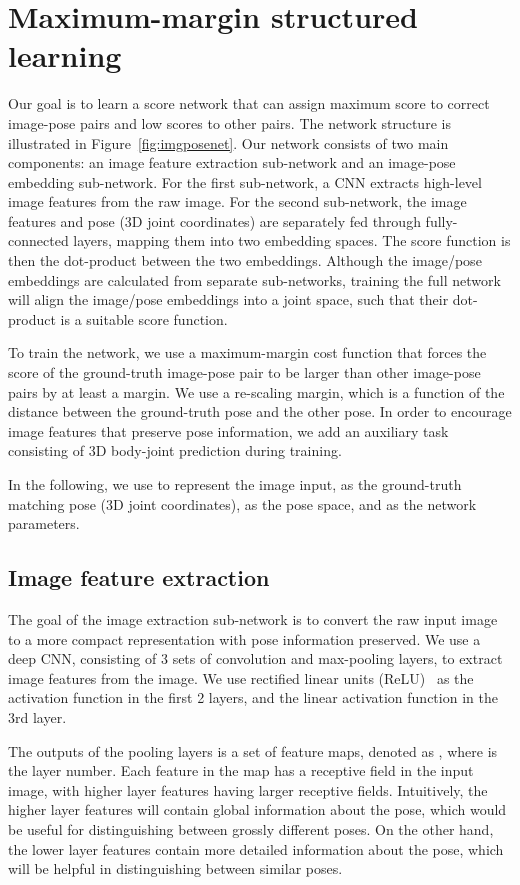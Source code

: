 \documentclass[10pt,twocolumn,letterpaper]{article}
\begin{document}
 \section{Maximum-margin structured learning}
\label{sec:structnet}
Our goal is to learn a score network that can assign maximum score to  correct image-pose pairs and low scores to other pairs.
The network structure is illustrated in Figure~\ref{fig:imgposenet}.
Our network consists of two main components: an image feature extraction sub-network and an image-pose embedding sub-network.
For the first sub-network, a CNN extracts high-level image features from the raw image.
For the second sub-network, 
the image features and pose (3D joint coordinates) are separately fed through fully-connected layers, mapping them into two embedding spaces. The score function is then the dot-product between the two embeddings.
Although the image/pose embeddings are calculated from separate sub-networks, training the full network will align the image/pose embeddings into a joint space, such that their dot-product is a suitable score function.



To train the network, we use a maximum-margin cost function that forces the score
of the ground-truth image-pose pair to be larger than other image-pose pairs by at least a margin.  We use a re-scaling margin, which is a function of the distance between the ground-truth pose and the other pose.
In order to encourage image features that preserve pose information, we add an auxiliary task consisting of 3D body-joint prediction during training.


In the following, we use  to represent the image input,  as the ground-truth matching pose (3D joint coordinates),  as the pose space, and  as the network parameters.


\subsection{Image feature extraction}
\vspace{-0.05in}
The goal of the image extraction sub-network is to convert the raw input image to a more compact representation with pose information preserved.
We use a deep CNN, consisting of 3 sets of convolution and max-pooling layers,  to extract image features from the image.
We use rectified linear units (ReLU)~\cite{relu2010} as the activation function in the first 2 layers, and the linear activation function in the 3rd  layer.

The outputs of the pooling layers is a set of feature maps, denoted as , where  is the layer number. 
Each feature in the map has a receptive field in the input image, with higher layer features having larger receptive fields.
Intuitively, the higher layer features will contain global information about the pose, which would be useful for distinguishing between grossly different poses.
On the other hand, the lower layer features contain more detailed information about the pose, which will be helpful in distinguishing between similar poses.
\end{document}
